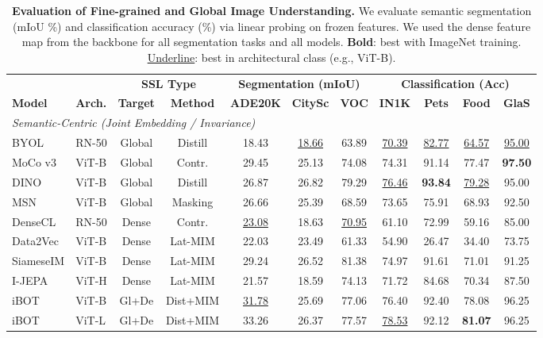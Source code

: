 \begin{table}[t]
\caption{\textbf{Evaluation of Fine-grained and Global Image Understanding.} We evaluate semantic segmentation (mIoU \%) and classification accuracy (\%) via linear probing on frozen features. We used the dense feature map from the backbone for all segmentation tasks and all models. \textbf{Bold}: best with ImageNet training. \underline{Underline}: best in architectural class (e.g., ViT-B).}
\label{tab:merged_results}
\begin{center}
\begin{small}
\begin{sc}
\begin{tabular}{l l c c | c c c | c c c c}
\toprule
& & \multicolumn{2}{c|}{\bf SSL Type} & \multicolumn{3}{c|}{\bf Segmentation (mIoU)} & \multicolumn{4}{c}{\bf Classification (Acc)} \\
\bf Model & \bf Arch. & \bf Target & \bf Method & \bf ADE20K & \bf CitySc & \bf VOC & \bf IN1K & \bf Pets & \bf Food & \bf GlaS \\
\midrule
\multicolumn{11}{l}{\it Semantic-Centric (Joint Embedding / Invariance)} \\
BYOL & RN-50 & Global & Distill & 18.43 & \underline{18.66} & 63.89 & \underline{70.39} & \underline{82.77} & \underline{64.57} & \underline{95.00} \\
MoCo v3 & ViT-B & Global & Contr. & 29.45 & 25.13 & 74.08 & 74.31 & 91.14 & 77.47 & \textbf{97.50} \\
DINO & ViT-B & Global & Distill & 26.87 & 26.82 & 79.29 & \underline{76.46} & \textbf{93.84} & \underline{79.28} & 95.00 \\
MSN & ViT-B & Global & Masking & 26.66 & 25.39 & 68.59 & 73.65 & 75.91 & 68.93 & 92.50 \\
DenseCL & RN-50 & Dense & Contr. & \underline{23.08} & 18.63 & \underline{70.95} & 61.10 & 72.99 & 59.16 & 85.00 \\
Data2Vec & ViT-B & Dense & Lat-MIM & 22.03 & 23.49 & 61.33 & 54.90 & 26.47 & 34.40 & 73.75 \\
SiameseIM & ViT-B & Dense & Lat-MIM & 29.24 & 26.52 & 81.38 & 74.97 & 91.61 & 71.01 & 91.25 \\
I-JEPA & ViT-H & Dense & Lat-MIM & 21.57 & 18.59 & 74.13 & 71.72 & 84.68 & 70.34 & 87.50 \\
iBOT & ViT-B & Gl+De & Dist+MIM & \underline{31.78} & 25.69 & 77.06 & 76.40 & 92.40 & 78.08 & 96.25 \\
iBOT & ViT-L & Gl+De & Dist+MIM & 33.26 & 26.37 & 77.57 & \underline{78.53} & 92.12 & \textbf{81.07} & 96.25\\

\end{tabular}
\end{sc}
\end{small}
\end{center}
\end{table}
